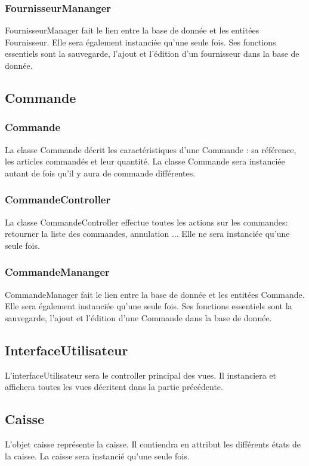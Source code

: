 \subsubsection{FournisseurMananger}
FournisseurManager fait le lien entre la base de donnée et les entitées Fournisseur. Elle sera également instanciée qu'une seule fois. Ses fonctions essentiels sont la sauvegarde, l'ajout et l'édition d'un fournisseur dans la base de donnée.

\subsection{Commande}
\subsubsection{Commande}
La classe Commande décrit les caractéristiques d'une Commande : sa référence, les articles commandés et leur quantité. La classe Commande sera instanciée autant de fois qu'il y aura de commande différentes.

\subsubsection{CommandeController}
La classe CommandeController effectue toutes les actions sur les commandes: retourner la liste des commandes, annulation ...
Elle ne sera instanciée qu'une seule fois.

\subsubsection{CommandeMananger}
CommandeManager fait le lien entre la base de donnée et les entitées Commande. Elle sera également instanciée qu'une seule fois. Ses fonctions essentiels sont la sauvegarde, l'ajout et l'édition d'une Commande dans la base de donnée.

\subsection{InterfaceUtilisateur}
L'interfaceUtilisateur sera le controller principal des vues. Il instanciera et affichera toutes les vues décritent dans la partie précédente.

\subsection{Caisse}
L'objet caisse représente la caisse. Il contiendra en attribut les différents états de la caisse. La caisse sera instancié qu'une seule fois.

